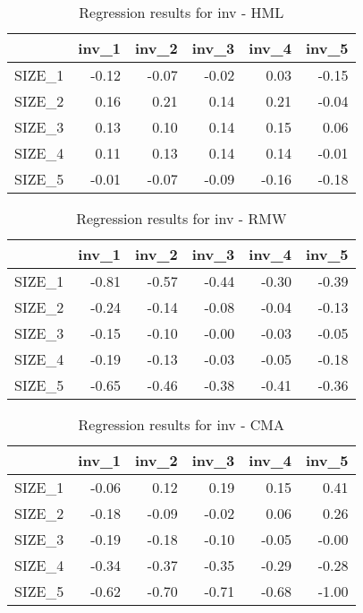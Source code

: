 \begin{table}[ht]
\centering
\caption{Regression results for inv - HML} 
\begin{tabular}{rrrrrr}
  \hline
 & inv\_1 & inv\_2 & inv\_3 & inv\_4 & inv\_5 \\ 
  \hline
SIZE\_1 & -0.12 & -0.07 & -0.02 & 0.03 & -0.15 \\ 
  SIZE\_2 & 0.16 & 0.21 & 0.14 & 0.21 & -0.04 \\ 
  SIZE\_3 & 0.13 & 0.10 & 0.14 & 0.15 & 0.06 \\ 
  SIZE\_4 & 0.11 & 0.13 & 0.14 & 0.14 & -0.01 \\ 
  SIZE\_5 & -0.01 & -0.07 & -0.09 & -0.16 & -0.18 \\ 
   \hline
\end{tabular}
\end{table}


\begin{table}[ht]
\centering
\caption{Regression results for inv - RMW} 
\begin{tabular}{rrrrrr}
  \hline
 & inv\_1 & inv\_2 & inv\_3 & inv\_4 & inv\_5 \\ 
  \hline
SIZE\_1 & -0.81 & -0.57 & -0.44 & -0.30 & -0.39 \\ 
  SIZE\_2 & -0.24 & -0.14 & -0.08 & -0.04 & -0.13 \\ 
  SIZE\_3 & -0.15 & -0.10 & -0.00 & -0.03 & -0.05 \\ 
  SIZE\_4 & -0.19 & -0.13 & -0.03 & -0.05 & -0.18 \\ 
  SIZE\_5 & -0.65 & -0.46 & -0.38 & -0.41 & -0.36 \\ 
   \hline
\end{tabular}
\end{table}


\begin{table}[ht]
\centering
\caption{Regression results for inv - CMA} 
\begin{tabular}{rrrrrr}
  \hline
 & inv\_1 & inv\_2 & inv\_3 & inv\_4 & inv\_5 \\ 
  \hline
SIZE\_1 & -0.06 & 0.12 & 0.19 & 0.15 & 0.41 \\ 
  SIZE\_2 & -0.18 & -0.09 & -0.02 & 0.06 & 0.26 \\ 
  SIZE\_3 & -0.19 & -0.18 & -0.10 & -0.05 & -0.00 \\ 
  SIZE\_4 & -0.34 & -0.37 & -0.35 & -0.29 & -0.28 \\ 
  SIZE\_5 & -0.62 & -0.70 & -0.71 & -0.68 & -1.00 \\ 
   \hline
\end{tabular}
\end{table}


